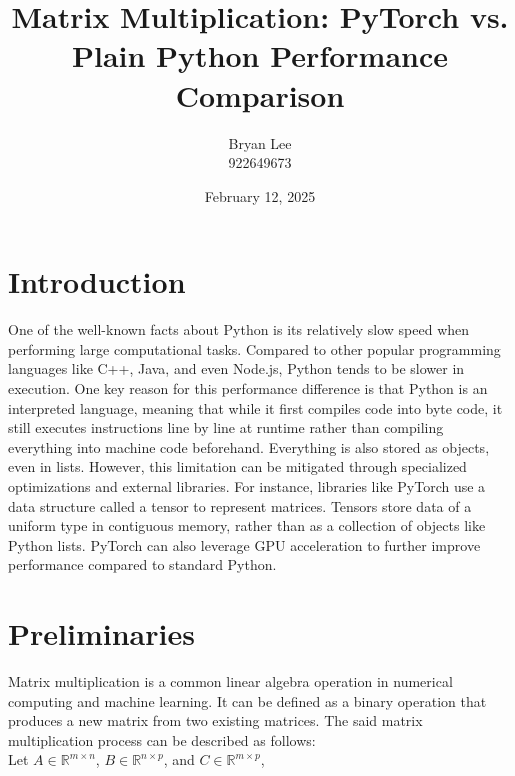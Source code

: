 \documentclass[12pt]{article}
\title{Matrix Multiplication: PyTorch vs. Plain Python Performance Comparison}
\author{Bryan Lee\\922649673}
\date{February 12, 2025}
\begin{document}
\maketitle
\thispagestyle{fancy}

\section{Introduction}
One of the well-known facts about Python is its relatively slow speed when performing large computational tasks.
Compared to other popular programming languages like C++, Java, and even Node.js, Python tends to be slower in execution.
One key reason for this performance difference is that Python is an interpreted language, meaning that while it first compiles code into byte code,
it still executes instructions line by line at runtime rather than compiling everything into machine code beforehand.
Everything is also stored as objects, even in lists.
However, this limitation can be mitigated through specialized optimizations and external libraries.
For instance, libraries like PyTorch use a data structure called a tensor to represent matrices.
Tensors store data of a uniform type in contiguous memory, rather than as a collection of objects like Python lists.
PyTorch can also leverage GPU acceleration to further improve performance compared to standard Python.

\section{Preliminaries}
Matrix multiplication is a common linear algebra operation in numerical computing and machine learning.
It can be defined as a binary operation that produces a new matrix from two existing matrices.
The said matrix multiplication process can be described as follows: \\

\noindent Let $A \in \mathbb{R}^{m \times n}$, $B \in \mathbb{R}^{n \times p}$, and $C \in \mathbb{R}^{m \times p}$,
\end{document}
